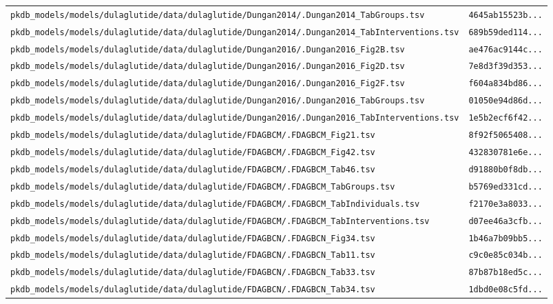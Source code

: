\begin{longtable}{ll}
\texttt{pkdb\_models/models/dulaglutide/data/dulaglutide/Dungan2014/.Dungan2014\_TabGroups.tsv} & \texttt{4645ab15523b...} \\
\texttt{pkdb\_models/models/dulaglutide/data/dulaglutide/Dungan2014/.Dungan2014\_TabInterventions.tsv} & \texttt{689b59ded114...} \\
\texttt{pkdb\_models/models/dulaglutide/data/dulaglutide/Dungan2016/.Dungan2016\_Fig2B.tsv} & \texttt{ae476ac9144c...} \\
\texttt{pkdb\_models/models/dulaglutide/data/dulaglutide/Dungan2016/.Dungan2016\_Fig2D.tsv} & \texttt{7e8d3f39d353...} \\
\texttt{pkdb\_models/models/dulaglutide/data/dulaglutide/Dungan2016/.Dungan2016\_Fig2F.tsv} & \texttt{f604a834bd86...} \\
\texttt{pkdb\_models/models/dulaglutide/data/dulaglutide/Dungan2016/.Dungan2016\_TabGroups.tsv} & \texttt{01050e94d86d...} \\
\texttt{pkdb\_models/models/dulaglutide/data/dulaglutide/Dungan2016/.Dungan2016\_TabInterventions.tsv} & \texttt{1e5b2ecf6f42...} \\
\texttt{pkdb\_models/models/dulaglutide/data/dulaglutide/FDAGBCM/.FDAGBCM\_Fig21.tsv} & \texttt{8f92f5065408...} \\
\texttt{pkdb\_models/models/dulaglutide/data/dulaglutide/FDAGBCM/.FDAGBCM\_Fig42.tsv} & \texttt{432830781e6e...} \\
\texttt{pkdb\_models/models/dulaglutide/data/dulaglutide/FDAGBCM/.FDAGBCM\_Tab46.tsv} & \texttt{d91880b0f8db...} \\
\texttt{pkdb\_models/models/dulaglutide/data/dulaglutide/FDAGBCM/.FDAGBCM\_TabGroups.tsv} & \texttt{b5769ed331cd...} \\
\texttt{pkdb\_models/models/dulaglutide/data/dulaglutide/FDAGBCM/.FDAGBCM\_TabIndividuals.tsv} & \texttt{f2170e3a8033...} \\
\texttt{pkdb\_models/models/dulaglutide/data/dulaglutide/FDAGBCM/.FDAGBCM\_TabInterventions.tsv} & \texttt{d07ee46a3cfb...} \\
\texttt{pkdb\_models/models/dulaglutide/data/dulaglutide/FDAGBCN/.FDAGBCN\_Fig34.tsv} & \texttt{1b46a7b09bb5...} \\
\texttt{pkdb\_models/models/dulaglutide/data/dulaglutide/FDAGBCN/.FDAGBCN\_Tab11.tsv} & \texttt{c9c0e85c034b...} \\
\texttt{pkdb\_models/models/dulaglutide/data/dulaglutide/FDAGBCN/.FDAGBCN\_Tab33.tsv} & \texttt{87b87b18ed5c...} \\
\texttt{pkdb\_models/models/dulaglutide/data/dulaglutide/FDAGBCN/.FDAGBCN\_Tab34.tsv} & \texttt{1dbd0e08c5fd...} \\

\end{longtable}
